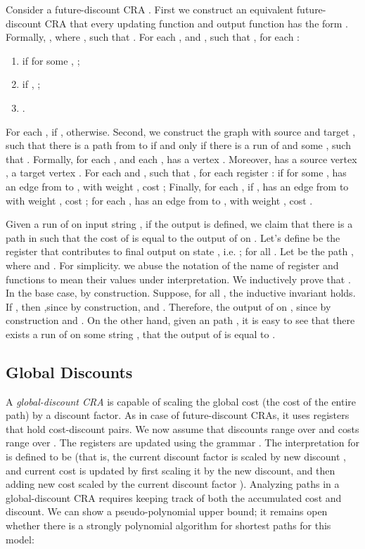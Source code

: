 \documentclass[11pt]{article}
\def\qed{{\bf }}
\newcommand{\mypar}[1]{\subsection{#1}}
\def\qed{{\bf }}
\begin{document}
Consider a future-discount CRA .
First we construct an equivalent future-discount CRA  that every updating function and output function has the form . Formally,
, where
 , such that . For each ,
 and , such that , for each :
\begin{enumerate}
\item if  for some , ;
\item if , ;
\item .
\end{enumerate}
For each ,  if ,
 otherwise.
Second, we construct the graph  with source  and target , such that there is a path  from  to  if and only if
there is a run  of  and some , such that .
Formally, for each , and each ,  has a vertex .
Moreover,  has a source vertex , a target vertex . For each
 and , such that
,  for each register :
if  for some ,  has an
edge  from  to , with weight , cost ;
Finally,
for each , if ,  has
an edge  from  to  with weight , cost ;
for each ,  has an edge  from  to , with weight , cost .

Given a run  of  on input string , if the output is defined,
we claim that there is a  path  in  such that the cost of  is equal to the output of  on .
Let's define  be the register that contributes to final output on state ,
i.e. ;  for all .
Let  be the path , where  and .
For simplicity. we abuse the notation of the name of register and functions to mean their values under
interpretation.
We inductively prove that .
In the base case,  by construction.
Suppose, for all , the inductive invariant holds.
If , then
,since by construction,
 and .
Therefore, the output of  on  , since by construction  and .
On the other hand, given an  path ,  it is easy to see that there exists a run   of  on some string , that the output of  is equal to .
\qed

\mypar{Global Discounts} A {\em global-discount CRA\/} is capable of
scaling the global cost (the cost of the entire path) by a discount
factor. As in case of future-discount CRAs, it uses registers that
hold cost-discount pairs. We now assume that discounts range over
 and costs range over . The registers are updated
using the grammar . The
interpretation for  is defined to be  (that is, the current discount factor  is scaled by new
discount , and current cost  is updated by first scaling it
by the new discount, and then adding new cost  scaled by the
current discount factor ). Analyzing paths in a global-discount
CRA requires keeping track of both the accumulated cost and
discount. We can show a pseudo-polynomial upper bound; it remains
open whether there is a strongly polynomial algorithm for shortest
paths for this model:
\end{document}
